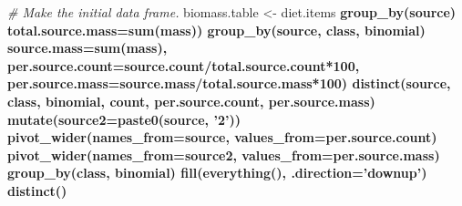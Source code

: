 \documentclass[
]{article}
\newenvironment{Shaded}{\begin{snugshade}}{\end{snugshade}}
\newcommand{\CommentTok}[1]{\textcolor[rgb]{0.56,0.35,0.01}{\textit{#1}}}
\newcommand{\DataTypeTok}[1]{\textcolor[rgb]{0.13,0.29,0.53}{#1}}
\newcommand{\DecValTok}[1]{\textcolor[rgb]{0.00,0.00,0.81}{#1}}
\newcommand{\KeywordTok}[1]{\textcolor[rgb]{0.13,0.29,0.53}{\textbf{#1}}}
\newcommand{\NormalTok}[1]{#1}
\newcommand{\OperatorTok}[1]{\textcolor[rgb]{0.81,0.36,0.00}{\textbf{#1}}}
\newcommand{\StringTok}[1]{\textcolor[rgb]{0.31,0.60,0.02}{#1}}
\begin{document}
\begin{Shaded}
\begin{Highlighting}[]
{{{{\CommentTok{# Make the initial data frame.}
\NormalTok{biomass.table <-}\StringTok{ }\NormalTok{diet.items }\OperatorTok{%>%}\StringTok{ }\KeywordTok{group_by}\NormalTok{(class, binomial) }\OperatorTok{%>%}\StringTok{ }\KeywordTok{mutate}\NormalTok{(}\DataTypeTok{count=}\KeywordTok{n}\NormalTok{()) }\OperatorTok{%>%}\StringTok{ }\KeywordTok{ungroup}\NormalTok{() }\OperatorTok{%>%}\StringTok{ }
\StringTok{  }\KeywordTok{group_by}\NormalTok{(source) }\OperatorTok{%>%}\StringTok{ }\KeywordTok{mutate}\NormalTok{(}\DataTypeTok{total.source.count=}\KeywordTok{n}\NormalTok{(), }
                              \DataTypeTok{total.source.mass=}\KeywordTok{sum}\NormalTok{(mass)) }\OperatorTok{%>%}\StringTok{ }\KeywordTok{ungroup}\NormalTok{() }\OperatorTok{%>%}\StringTok{ }
\StringTok{  }\KeywordTok{group_by}\NormalTok{(source, class, binomial) }\OperatorTok{%>%}\StringTok{ }\KeywordTok{mutate}\NormalTok{(}\DataTypeTok{source.count=}\KeywordTok{n}\NormalTok{(), }
                                               \DataTypeTok{source.mass=}\KeywordTok{sum}\NormalTok{(mass),}
                                               \DataTypeTok{per.source.count=}\NormalTok{source.count}\OperatorTok{/}\NormalTok{total.source.count}\OperatorTok{*}\DecValTok{100}\NormalTok{,}
                                               \DataTypeTok{per.source.mass=}\NormalTok{source.mass}\OperatorTok{/}\NormalTok{total.source.mass}\OperatorTok{*}\DecValTok{100}\NormalTok{) }\OperatorTok{%>%}\StringTok{ }
\StringTok{  }\KeywordTok{distinct}\NormalTok{(source, class, binomial, count, per.source.count, per.source.mass) }\OperatorTok{%>%}\StringTok{ }
\StringTok{  }\KeywordTok{mutate}\NormalTok{(}\DataTypeTok{source2=}\KeywordTok{paste0}\NormalTok{(source, }\StringTok{'2'}\NormalTok{)) }\OperatorTok{%>%}\StringTok{ }
\StringTok{  }\KeywordTok{pivot_wider}\NormalTok{(}\DataTypeTok{names_from=}\NormalTok{source, }\DataTypeTok{values_from=}\NormalTok{per.source.count) }\OperatorTok{%>%}\StringTok{ }
\StringTok{  }\KeywordTok{pivot_wider}\NormalTok{(}\DataTypeTok{names_from=}\NormalTok{source2, }\DataTypeTok{values_from=}\NormalTok{per.source.mass) }\OperatorTok{%>%}\StringTok{ }\KeywordTok{ungroup}\NormalTok{() }\OperatorTok{%>%}\StringTok{ }
\StringTok{  }\KeywordTok{group_by}\NormalTok{(class, binomial) }\OperatorTok{%>%}\StringTok{ }
\StringTok{  }\KeywordTok{fill}\NormalTok{(}\KeywordTok{everything}\NormalTok{(), }\DataTypeTok{.direction=}\StringTok{'downup'}\NormalTok{) }\OperatorTok{%>%}\StringTok{ }
\StringTok{  }\KeywordTok{distinct}\NormalTok{() }\OperatorTok{%>%}\StringTok{ }\KeywordTok{left_join}\NormalTok{(prey.list, }\DataTypeTok{by=}\KeywordTok{c}\NormalTok{(}\StringTok{'class'}\NormalTok{, }\StringTok{'binomial'}\NormalTok{)) }\OperatorTok{%>%}\StringTok{ }
}}}}}}}}}}}}}}}}
\end{Highlighting}
\end{Shaded}
\end{document}
